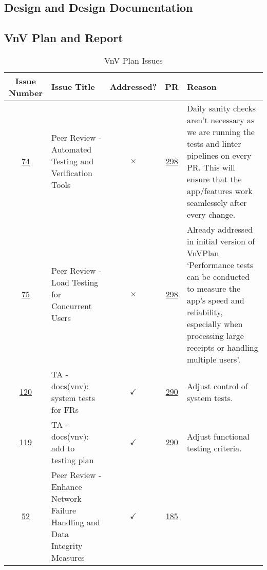 \documentclass{article}
\begin{document}
\subsection{Design and Design Documentation}

\subsection{VnV Plan and Report}

\begin{table}[H]
    \caption{VnV Plan Issues}
    \noindent 
    \begin{tabular}{c p{3.5cm} c c p{4cm}} 
    \toprule 
        \textbf{Issue Number} & \textbf{Issue Title} & \textbf{Addressed?} & \textbf{PR} & \textbf{Reason} \\ 
        \midrule
        \href{https://github.com/PlutosCapstone/Plutos/issues/74}{74} & Peer
        Review - Automated Testing and Verification Tools & $\times$ &
        \href{https://github.com/PlutosCapstone/Plutos/pull/298}{298} &  Daily
        sanity checks aren't necessary as we are running the tests and linter
        pipelines on every PR. This will ensure that the app/features work
        seamlessely after every change. \\ 
        \hline
        \href{https://github.com/PlutosCapstone/Plutos/issues/75}{75} & Peer
        Review - Load Testing for Concurrent Users & $\times$ &
        \href{https://github.com/PlutosCapstone/Plutos/pull/298}{298} &  Already
        addressed in initial version of VnVPlan `Performance tests can be
        conducted to measure the app's speed and reliability, especially when
        processing large receipts or handling multiple users'. \\ 
        \hline
        \href{https://github.com/PlutosCapstone/Plutos/issues/120}{120} & TA -
        docs(vnv): system tests for FRs & $\checkmark$ &
        \href{https://github.com/PlutosCapstone/Plutos/pull/290}{290} &  Adjust
        control of system tests. \\ 
        \hline
        \href{https://github.com/PlutosCapstone/Plutos/issues/119}{119} & TA -
        docs(vnv): add to testing plan & $\checkmark$ &
        \href{https://github.com/PlutosCapstone/Plutos/pull/290}{290} &  Adjust
        functional testing criteria. \\
        \hline
        \href{https://github.com/PlutosCapstone/Plutos/issues/52}{52} & Peer Review - Enhance Network Failure Handling and Data Integrity Measures & $\checkmark$ &
        \href{https://github.com/PlutosCapstone/Plutos/pull/185}{185} &  \\
    \bottomrule
    \end{tabular} 
\end{table}
\end{document}
